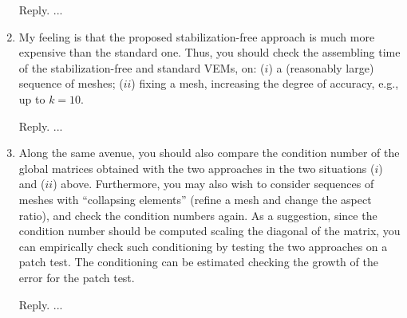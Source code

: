 \documentclass[10pt]{amsart}
\theoremstyle{definition}
\theoremstyle{remark}
\begin{document}
\begin{enumerate}[1.]
\smallskip \noindent \textcolor[rgb]{1.00,0.00,0.00}{Reply.}
...

\medskip

\item \textsf{My feeling is that the proposed stabilization-free approach is much more expensive than the standard one. Thus, you should check the assembling time of the stabilization-free and standard VEMs, on: ($i$) a (reasonably large) sequence of meshes; ($ii$) fixing a mesh, increasing the degree of accuracy, e.g., up to $k = 10$.}

\smallskip \noindent \textcolor[rgb]{1.00,0.00,0.00}{Reply.}
...

\medskip

\item \textsf{Along the same avenue, you should also compare the condition number of the global matrices obtained with the two approaches in the two situations ($i$) and ($ii$) above. Furthermore, you may also wish to consider sequences of meshes with “collapsing elements” (refine a mesh and change the aspect ratio), and check the condition numbers again. As a suggestion, since the condition number should be computed scaling the diagonal of the matrix, you can empirically check such conditioning by testing the two approaches on a patch test. The conditioning can be estimated checking the growth of the error for the patch test.}

\smallskip \noindent \textcolor[rgb]{1.00,0.00,0.00}{Reply.}
...

\medskip


\end{enumerate}
\end{document}
